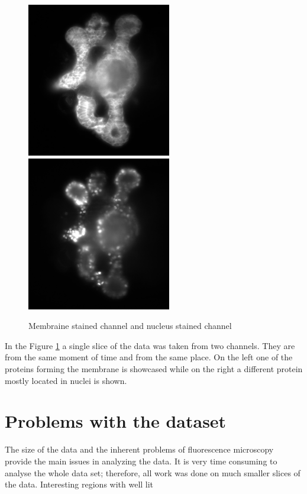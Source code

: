 \documentclass[
  digital,     %
  oneside,     %
  nosansbold,  %
  nocolorbold, %
  lof,         %
  lot,         %
]{fithesis4}
\begin{document}
\begin{figure}
    \begin{center}
        \includegraphics[width=6.3cm]{resources/C3-t006-200-scaled.jpg}
        \includegraphics[width=6.3cm]{resources/C2-t006-200-scaled.jpg}
    \end{center}
    \caption{Membraine stained channel and nucleus stained channel}
    \label{fig:data_example}
\end{figure}
In the Figure \ref{fig:data_example} a single slice of the data was taken from
two channels. They are from the same moment of time and from the same place. On
the left one of the proteins forming the membrane is showcased while on the right a
different protein mostly located in nuclei is shown.

\section{Problems with the dataset}

The size of the data and the inherent problems of fluorescence microscopy
provide the main issues in analyzing the data. It is very time consuming to
analyse the whole data set; therefore, all work was done on much smaller slices
of the data. Interesting regions with well lit
\end{document}
